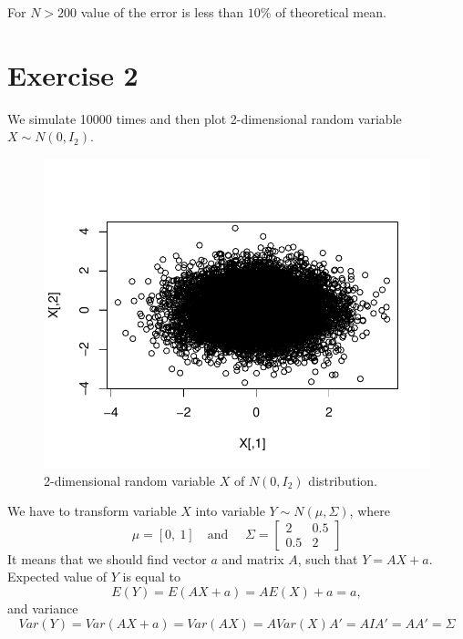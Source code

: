 \documentclass[12pt, a4paper]{article}\usepackage[]{graphicx}\usepackage[]{color}
\makeatletter
\def\maxwidth{ %
  \ifdim\Gin@nat@width>\linewidth
    \linewidth
  \else
    \Gin@nat@width
  \fi
}
\newenvironment{knitrout}{}{} %
\makeatother
\begin{document}
For $N>200$ value of the error is less than $10\%$ of theoretical mean.
















\section{Exercise 2}

We simulate 10000 times and then plot 2-dimensional random variable $X\sim N(0,I_2)$.

\begin{knitrout}
\color{fgcolor}\begin{figure}[H]

{\centering \includegraphics[width=\maxwidth]{figure/ex2X-1} 

}

\caption[2-dimensional random variable $X$ of $N(0,I_2)$ distribution]{2-dimensional random variable $X$ of $N(0,I_2)$ distribution.}\label{fig:ex2X}
\end{figure}


\end{knitrout}

We have to transform variable $X$ into variable $Y \sim N(\mu, \Sigma)$, where 
\[\mu = \left[0,\ 1\right] \quad \text{and }\quad 
  \Sigma = \left[
    \begin{matrix}  
      2   & 0.5 \\
      0.5 & 2
    \end{matrix} 
    \right]
\]
It means that we should find vector $a$ and matrix $A$, such that $Y=A X + a$. 
Expected value of $Y$ is equal to
\[E(Y) = E(AX+a) = A E(X)+a = a, \]
and variance
\[Var(Y) = Var(AX+a) = Var(AX) = A Var(X) A' = A I A' = A A' = \Sigma \]
\end{document}
